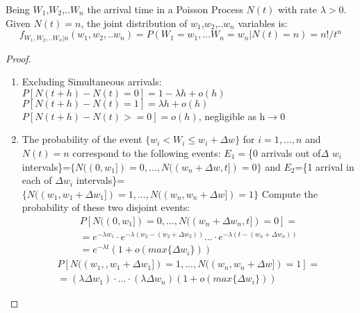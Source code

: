 \begin{theorem}
	Being $W_{1}$,$W_{2}$,..$W_{n}$ the arrival time in a Poisson Process $N(t)$ with rate ${\lambda}>0$. Given $N(t)=n$, the joint distribution of $w_{1}$,$w_{2}$,..$w_{n}$ variables is:
	\begin{equation}
	f_{W_1,W_2,..W_n|n} (w_1,w_2,..w_n) = P (W_1=w_1,...W_n=w_n|N(t)=n) = n!/t^n
	\end{equation}
	\begin{proof}
		\begin{enumerate}
			\item Excluding Simultaneous arrivals: \newline
		$	P[N(t+h)-N(t)=0]= 1 - \lambda h+ o(h)$ \newline
		$    P[N(t+h)-N(t)=1]= \lambda h+ o(h)$     \newline
		$    P[N(t+h)-N(t)>=0]= o(h)$, negligible as h$\rightarrow$0  \newline
		\item 
	 The probability of the event $ \{w_i<W_i \leq w_i+\Delta w \}$ for $i=1,...,n$ and $N(t)=n$
	  correspond to the following events: 
	  \newline $E_1=$\{0 arrivals out of$\Delta$ $w_i$ intervals\}=$\{N((0,w_1])=0,...,N((w_n+\Delta w,t])=0 \} $ 
	  \newline and
	  \newline $E_2$=\{1 arrival in each of $\Delta$$w_i$ intervals\}=$\{N((w_1,w_1+\Delta w_1])=1,...,N((w_n,w_n+\Delta w])=1\}$ 
	 \newline Compute the probability of these two disjoint events:
	  \begin{equation}
	  \begin{split}
	  P[N((0,w_1])=0,...,N((w_n+\Delta w_n,t])=0] =\\
	 = e^{-\lambda w_1} \cdot e^{-\lambda (w_2-(w_2+\Delta w_2))} ... \cdot e^{-\lambda (t-(w_n+\Delta w_n))}\\
	  =e^{-\lambda t} (1+o(max\{\Delta w_i\}))
	  \end{split}
       \end{equation}
       \newline
       \begin{equation}
      \begin{split}
     	P[N((w_1,,w_1+\Delta w_1])=1,...,N((w_n,w_n+\Delta w])=1] =\\
        = (\lambda \Delta w_1) \cdot ... \cdot(\lambda \Delta w_n) (1+o(max\{\Delta w_i\}))
      \end{split}

\end{equation}$$
\end{enumerate}
\end{proof}
\end{theorem}
